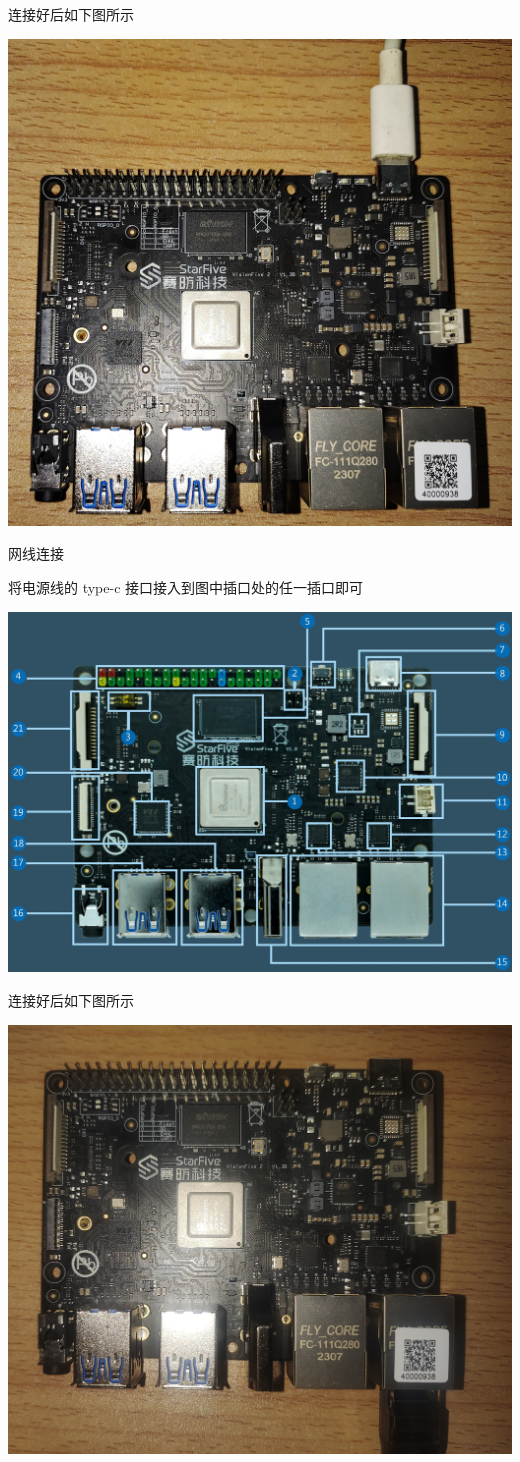 {	\raggedright
	\setlength{\parindent}{2em}
	
	连接好后如下图所示
	
	\centering
	\includegraphics[width=0.58\linewidth]{figures/08-02-连接电源线.jpg}
	
	\raggedright
	\setlength{\parindent}{2em}
	 网线连接
	
	将电源线的 type-c 接口接入到图中插口处的任一插口即可
	
	\centering
	\includegraphics[width=0.58\linewidth]{figures/08-02-赛昉结构.jpg}
	
	
	\raggedright
	\setlength{\parindent}{2em}
	
	连接好后如下图所示
	
	\centering
	\includegraphics[width=0.58\linewidth]{figures/08-02-连接网线.jpg}
	
}

